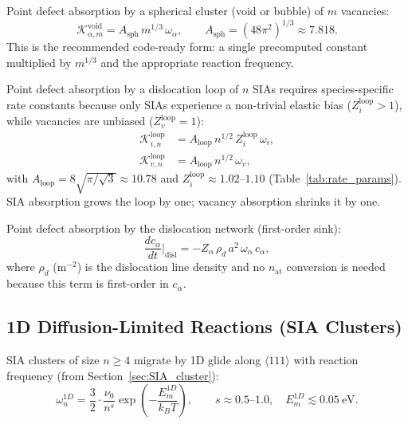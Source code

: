 Point defect absorption by a spherical cluster (void or bubble) of $m$
vacancies:
\begin{equation}\label{eq:K_void}
    \mathcal{K}_{\alpha,m}^{\mathrm{void}}
    = A_{\mathrm{sph}}\,m^{1/3}\,\omega_\alpha,
    \qquad A_{\mathrm{sph}} = (48\pi^2)^{1/3} \approx 7.818.
\end{equation}
This is the recommended code-ready form: a single precomputed constant
multiplied by $m^{1/3}$ and the appropriate reaction frequency.

Point defect absorption by a dislocation loop of $n$ SIAs requires
species-specific rate constants because only SIAs experience a non-trivial
elastic bias ($Z_i^{\mathrm{loop}} > 1$), while vacancies are unbiased
($Z_v^{\mathrm{loop}} = 1$):
\begin{align}
    \mathcal{K}_{i,n}^{\mathrm{loop}}
    &= A_{\mathrm{loop}}\,n^{1/2}\,Z_i^{\mathrm{loop}}\,\omega_i,
    \label{eq:K_loop_i}\\[2pt]
    \mathcal{K}_{v,n}^{\mathrm{loop}}
    &= A_{\mathrm{loop}}\,n^{1/2}\,\omega_v,
    \label{eq:K_loop_v}
\end{align}
with $A_{\mathrm{loop}} = 8\sqrt{\pi/\sqrt{3}} \approx 10.78$ and
$Z_i^{\mathrm{loop}} \approx 1.02$--$1.10$ (Table~\ref{tab:rate_params}).
SIA absorption grows the loop by one; vacancy absorption shrinks it by one.

Point defect absorption by the dislocation network (first-order sink):
\begin{equation}\label{eq:K_disl}
    \frac{dc_\alpha}{dt}\bigg|_{\mathrm{disl}}
    = -Z_\alpha\,\rho_d\,a^2\,\omega_\alpha\,c_\alpha,
\end{equation}
where $\rho_d$ (m$^{-2}$) is the dislocation line density and no
$n_{\mathrm{at}}$ conversion is needed because this term is first-order in
$c_\alpha$.

\subsection{1D Diffusion-Limited Reactions (SIA Clusters)}
\label{sec:K1D}

SIA clusters of size $n \geq 4$ migrate by 1D glide along $\langle111\rangle$
with reaction frequency (from Section~\ref{sec:SIA_cluster}):
\begin{equation}\label{eq:omega_1D}
    \omega_n^{1D} = \frac{3}{2}\cdot\frac{\nu_0}{n^s}
    \exp\!\left(-\frac{E_m^{1D}}{k_BT}\right),
    \qquad s \approx 0.5\text{--}1.0, \quad E_m^{1D} \lesssim 0.05~\text{eV}.
\end{equation}

